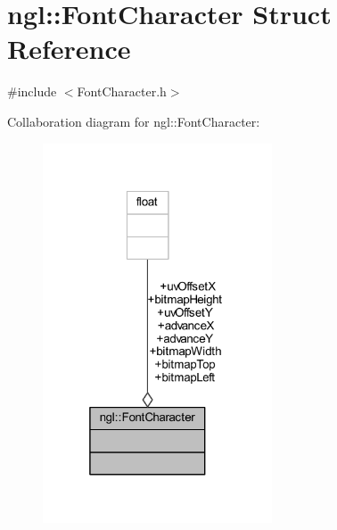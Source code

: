 \hypertarget{structngl_1_1_font_character}{}\section{ngl\+:\+:Font\+Character Struct Reference}
\label{structngl_1_1_font_character}


{\ttfamily \#include $<$Font\+Character.\+h$>$}



Collaboration diagram for ngl\+:\+:Font\+Character\+:
\nopagebreak
\begin{figure}[H]
\begin{center}
\leavevmode
\includegraphics[width=193pt]{structngl_1_1_font_character__coll__graph}
\end{center}
\end{figure}
